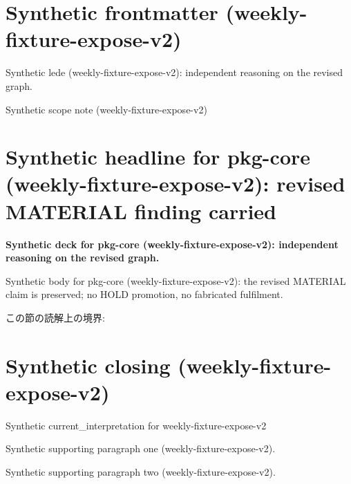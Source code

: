 \documentclass[lualatex,a4paper,10pt]{jlreq}
\begin{document}
\surveycover
\clearpage
\section*{Synthetic frontmatter (weekly-fixture-expose-v2)}
Synthetic lede (weekly-fixture-expose-v2): independent reasoning on the revised graph.

\begin{claimboundary}
\noindent Synthetic scope note (weekly-fixture-expose-v2)\par
\end{claimboundary}
\clearpage
\twocolumn
\section{Synthetic headline for pkg-core (weekly-fixture-expose-v2): revised MATERIAL finding carried}
\label{pkg:pkg-core}
\noindent\textbf{Synthetic deck for pkg-core (weekly-fixture-expose-v2): independent reasoning on the revised graph.} \cite{w2026-W33target-source}\par\medskip
\noindent Synthetic body for pkg-core (weekly-fixture-expose-v2): the revised MATERIAL claim is preserved; no HOLD promotion, no fabricated fulfilment.\par\medskip
\begin{claimboundary}
この節の読解上の境界: 
\end{claimboundary}
\clearpage
\onecolumn
\section{Synthetic closing (weekly-fixture-expose-v2)}
\label{sec:issue-summary}
\noindent Synthetic current\_interpretation for weekly-fixture-expose-v2\par\medskip
\noindent Synthetic supporting paragraph one (weekly-fixture-expose-v2).\par\medskip
\noindent Synthetic supporting paragraph two (weekly-fixture-expose-v2).\par\medskip
\clearpage
\onecolumn
\printbibliography[title={References / Source Notes}]
\end{document}
